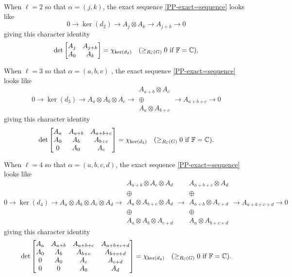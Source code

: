 \begin{example}\rm
When $\ell=2$ so that $\alpha=(j,k)$, the exact sequence \eqref{PP-exact=sequence} looks like
$$
0 \rightarrow \ker(d_2)
\rightarrow A_j \otimes A_k 
\rightarrow A_{j+k}
\rightarrow 0
$$
giving this character identity 
$$
\det\left[
\begin{matrix}
A_j & A_{j+k} \\
A_0 & A_k
\end{matrix}
\right]
=\chi_{\ker(d_2)} \quad (\geq_{R_{\mathbb{C}}(G)} 0 \text{ if }\mathbb{F}=\mathbb{C}).
$$

When $\ell=3$ so that $\alpha=(a,b,c)$ , the exact sequence \eqref{PP-exact=sequence} looks like
$$
0 \rightarrow \ker(d_3)
\rightarrow A_a \otimes A_b \otimes A_c 
\rightarrow 
\begin{matrix}
    A_{a+b} \otimes A_c \\
\oplus \\
A_a \otimes A_{b+c}
\end{matrix}
\rightarrow A_{a+b+c}
\rightarrow 0
$$
giving this character identity 
$$
\det\left[
\begin{matrix}
A_a & A_{a+b} & A_{a+b+c}\\
A_0 & A_b & A_{b+c}\\
0 & A_0 & A_{c}
\end{matrix}
\right]
=\chi_{\ker(d_3)} \quad (\geq_{R_{\mathbb{C}}(G)} 0 \text{ if }\mathbb{F}=\mathbb{C}).
$$

When $\ell=4$ so that $\alpha=(a,b,c,d)$, the exact sequence \eqref{PP-exact=sequence} looks like 
$$
0 \rightarrow \ker(d_4)
\rightarrow A_a \otimes A_b \otimes A_c  \otimes A_d
\rightarrow 
\begin{matrix}
A_{a+b} \otimes A_c \otimes A_d\\ 
\oplus \\
A_a \otimes A_{b+c} \otimes A_d \\
\oplus\\
A_a \otimes A_b \otimes A_{c+d}
\end{matrix}
\rightarrow 
\begin{matrix}
A_{a+b+c} \otimes A_d \\
\oplus\\
A_{a+b} \otimes A_{c+d}\\
\oplus\\
A_a \otimes A_{b+c+d}
\end{matrix}
\rightarrow A_{a+b+c+d}
\rightarrow 0
$$
giving this character identity 
$$
\det\left[
\begin{matrix}
A_a & A_{a+b} & A_{a+b+c}&A_{a+b+c+d}\\
A_0 & A_b & A_{b+c}&A_{b+c+d}\\
0 & A_0 & A_{c}& A_{c+d}\\
0 & 0 & A_0 & A_d
\end{matrix}
\right]
=\chi_{\ker(d_4)} \quad (\geq_{R_{\mathbb{C}}(G)} 0 \text{ if }\mathbb{F}=\mathbb{C}).
$$    
\end{example}

